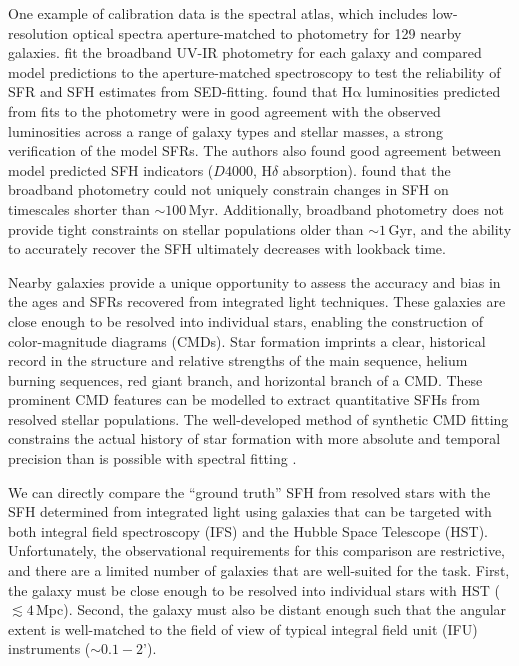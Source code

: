 \documentclass[preprint2]{aastex62}
\newcommand{\ha}{\ensuremath{\mathrm{H\alpha}}\xspace}
\newcommand{\Myr}{$\,$Myr\xspace}
\newcommand{\Gyr}{$\,$Gyr\xspace}
\begin{document}
One example of calibration data is the \citet{Brown+2014} spectral atlas, which includes low-resolution optical spectra aperture-matched to photometry for 129 nearby galaxies. \citet{Leja+2017} fit the broadband UV-IR photometry for each galaxy and compared model predictions to the aperture-matched spectroscopy to test the reliability of SFR and SFH estimates from SED-fitting. \citeauthor{Leja+2017} found that \ha luminosities predicted from fits to the photometry were in good agreement with the observed luminosities across a range of galaxy types and stellar masses, a strong verification of the model SFRs. The authors also found good agreement between model predicted SFH indicators ($D4000$, H$\delta$ absorption). \citeauthor{Leja+2017} found that the broadband photometry could not uniquely constrain changes in SFH on timescales shorter than $\sim100$\Myr. Additionally, broadband photometry does not provide tight constraints on stellar populations older than $\sim1$\Gyr, and the ability to accurately recover the SFH ultimately decreases with lookback time.

Nearby galaxies provide a unique opportunity to assess the accuracy and bias in the ages and SFRs recovered from integrated light techniques. These galaxies are close enough to be resolved into individual stars, enabling the construction of color-magnitude diagrams (CMDs). Star formation imprints a clear, historical record in the structure and relative strengths of the main sequence, helium burning sequences, red giant branch, and horizontal branch of a CMD. These prominent CMD features can be modelled to extract quantitative SFHs from resolved stellar populations. The well-developed method of synthetic CMD fitting constrains the actual history of star formation with more absolute and temporal precision than is possible with spectral fitting \citep[see \citet{Tolstoy+2009} and references therein; also ][]{Weisz+2011}.

We can directly compare the ``ground truth'' SFH from resolved stars with the SFH determined from integrated light using galaxies that can be targeted with both integral field spectroscopy (IFS) and the Hubble Space Telescope (HST). Unfortunately, the observational requirements for this comparison are restrictive, and there are a limited number of galaxies that are well-suited for the task. First, the galaxy must be close enough to be resolved into individual stars with HST ($\lesssim4$\,Mpc). Second, the galaxy must also be distant enough such that the angular extent is well-matched to the field of view of typical integral field unit (IFU) instruments (${\sim}0.1-2$').
\end{document}

